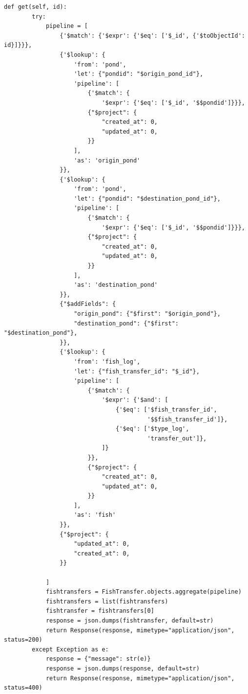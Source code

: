 \begin{enumerate}[1.]
\begin{lstlisting}
def get(self, id):
        try:
            pipeline = [
                {'$match': {'$expr': {'$eq': ['$_id', {'$toObjectId': id}]}}},
                {'$lookup': {
                    'from': 'pond',
                    'let': {"pondid": "$origin_pond_id"},
                    'pipeline': [
                        {'$match': {
                            '$expr': {'$eq': ['$_id', '$$pondid']}}},
                        {"$project": {
                            "created_at": 0,
                            "updated_at": 0,
                        }}
                    ],
                    'as': 'origin_pond'
                }},
                {'$lookup': {
                    'from': 'pond',
                    'let': {"pondid": "$destination_pond_id"},
                    'pipeline': [
                        {'$match': {
                            '$expr': {'$eq': ['$_id', '$$pondid']}}},
                        {"$project": {
                            "created_at": 0,
                            "updated_at": 0,
                        }}
                    ],
                    'as': 'destination_pond'
                }},
                {"$addFields": {
                    "origin_pond": {"$first": "$origin_pond"},
                    "destination_pond": {"$first": "$destination_pond"},
                }},
                {'$lookup': {
                    'from': 'fish_log',
                    'let': {"fish_transfer_id": "$_id"},
                    'pipeline': [
                        {'$match': {
                            '$expr': {'$and': [
                                {'$eq': ['$fish_transfer_id',
                                         '$$fish_transfer_id']},
                                {'$eq': ['$type_log',
                                         'transfer_out']},
                            ]}
                        }},
                        {"$project": {
                            "created_at": 0,
                            "updated_at": 0,
                        }}
                    ],
                    'as': 'fish'
                }},
                {"$project": {
                    "updated_at": 0,
                    "created_at": 0,
                }}

            ]
            fishtransfers = FishTransfer.objects.aggregate(pipeline)
            fishtransfers = list(fishtransfers)
            fishtransfer = fishtransfers[0]
            response = json.dumps(fishtransfer, default=str)
            return Response(response, mimetype="application/json", status=200)
        except Exception as e:
            response = {"message": str(e)}
            response = json.dumps(response, default=str)
            return Response(response, mimetype="application/json", status=400)
\end{lstlisting}



\end{enumerate}
